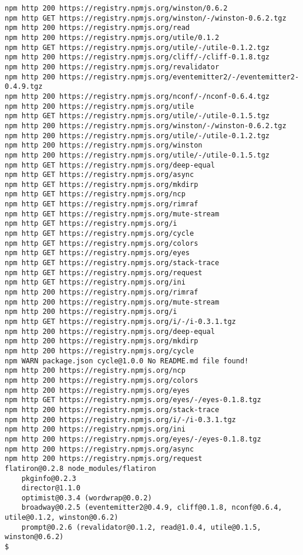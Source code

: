 \begin{lstlisting}
npm http 200 https://registry.npmjs.org/winston/0.6.2
npm http GET https://registry.npmjs.org/winston/-/winston-0.6.2.tgz
npm http 200 https://registry.npmjs.org/read
npm http 200 https://registry.npmjs.org/utile/0.1.2
npm http GET https://registry.npmjs.org/utile/-/utile-0.1.2.tgz
npm http 200 https://registry.npmjs.org/cliff/-/cliff-0.1.8.tgz
npm http 200 https://registry.npmjs.org/revalidator
npm http 200 https://registry.npmjs.org/eventemitter2/-/eventemitter2-0.4.9.tgz
npm http 200 https://registry.npmjs.org/nconf/-/nconf-0.6.4.tgz
npm http 200 https://registry.npmjs.org/utile
npm http GET https://registry.npmjs.org/utile/-/utile-0.1.5.tgz
npm http 200 https://registry.npmjs.org/winston/-/winston-0.6.2.tgz
npm http 200 https://registry.npmjs.org/utile/-/utile-0.1.2.tgz
npm http 200 https://registry.npmjs.org/winston
npm http 200 https://registry.npmjs.org/utile/-/utile-0.1.5.tgz
npm http GET https://registry.npmjs.org/deep-equal
npm http GET https://registry.npmjs.org/async
npm http GET https://registry.npmjs.org/mkdirp
npm http GET https://registry.npmjs.org/ncp
npm http GET https://registry.npmjs.org/rimraf
npm http GET https://registry.npmjs.org/mute-stream
npm http GET https://registry.npmjs.org/i
npm http GET https://registry.npmjs.org/cycle
npm http GET https://registry.npmjs.org/colors
npm http GET https://registry.npmjs.org/eyes
npm http GET https://registry.npmjs.org/stack-trace
npm http GET https://registry.npmjs.org/request
npm http GET https://registry.npmjs.org/ini
npm http 200 https://registry.npmjs.org/rimraf
npm http 200 https://registry.npmjs.org/mute-stream
npm http 200 https://registry.npmjs.org/i
npm http GET https://registry.npmjs.org/i/-/i-0.3.1.tgz
npm http 200 https://registry.npmjs.org/deep-equal
npm http 200 https://registry.npmjs.org/mkdirp
npm http 200 https://registry.npmjs.org/cycle
npm WARN package.json cycle@1.0.0 No README.md file found!
npm http 200 https://registry.npmjs.org/ncp
npm http 200 https://registry.npmjs.org/colors
npm http 200 https://registry.npmjs.org/eyes
npm http GET https://registry.npmjs.org/eyes/-/eyes-0.1.8.tgz
npm http 200 https://registry.npmjs.org/stack-trace
npm http 200 https://registry.npmjs.org/i/-/i-0.3.1.tgz
npm http 200 https://registry.npmjs.org/ini
npm http 200 https://registry.npmjs.org/eyes/-/eyes-0.1.8.tgz
npm http 200 https://registry.npmjs.org/async
npm http 200 https://registry.npmjs.org/request
flatiron@0.2.8 node_modules/flatiron
    pkginfo@0.2.3
    director@1.1.0
    optimist@0.3.4 (wordwrap@0.0.2)
    broadway@0.2.5 (eventemitter2@0.4.9, cliff@0.1.8, nconf@0.6.4, utile@0.1.2, winston@0.6.2)
    prompt@0.2.6 (revalidator@0.1.2, read@1.0.4, utile@0.1.5, winston@0.6.2)
$
\end{lstlisting}

